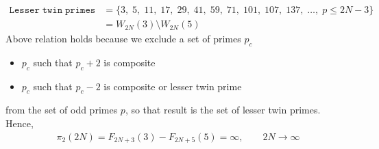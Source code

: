 \begin{align*}
    \mathtt{Lesser \; twin \; primes} &= \{ 3, \; 5, \; 11, \; 17, \; 29, \; 41, \; 59, \; 71, \; 101, \; 107, \; 137, \; \dots, \;  p \leq 2N - 3 \} \\
    &= W_{2N}(3) \setminus W_{2N}(5)
\end{align*}
Above relation holds because we exclude a set of primes $p_c$
\begin{itemize}
    \item $p_c$ such that $p_c+2$ is composite
    \item $p_c$ such that $p_c-2$ is composite or lesser twin prime
\end{itemize}
from the set of odd primes $p$, so that result is the set of lesser twin primes.
Hence,
\begin{align*}
    \pi_2 (2N) = F_{2N+3}(3) - F_{2N+5}(5) = \infty, \quad \quad 2N \to \infty
\end{align*}
